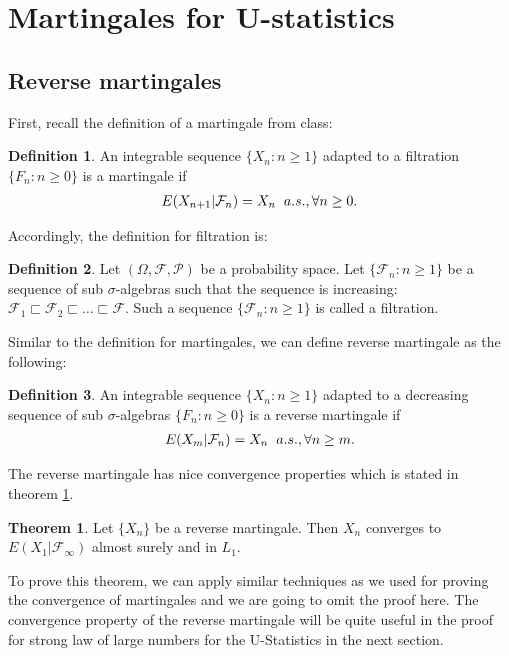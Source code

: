 \documentclass{article}
\theoremstyle{definition}
\newtheorem{theorem}{Theorem}
\newtheorem{Def}{Definition}
\numberwithin{Def}{section}
\begin{document}
\section{Martingales for U-statistics}
\subsection{Reverse martingales}
First, recall the definition of a martingale from class:
\begin{Def}
An integrable sequence $\{X_n: n\ge 1\}$ adapted to a filtration $\{F_n: n\ge 0\}$ is a martingale if
\begin{align*}
 E(X_{n+1}|\mathcal{F}_n)=X_n \hspace{0.2cm} a.s., \forall n\ge0.
\end{align*}
\end{Def}

Accordingly, the definition for filtration is:
\begin{Def}
Let $(\Omega, \mathcal{F}, \mathcal{P})$ be a probability space. Let $\{\mathcal{F}_n: n\ge1\}$ be a sequence of sub $\sigma$-algebras such that the sequence is increasing: $\mathcal{F}_1 \sqsubset \mathcal{F}_2 \sqsubset \dotsc \sqsubset \mathcal{F}$. Such a sequence $\{\mathcal{F}_n: n\ge1\}$ is called a filtration. 
\end{Def}

Similar to the definition for martingales, we can define reverse martingale as the following:
\begin{Def}
An integrable sequence $\{X_n: n\ge 1\}$ adapted to a decreasing sequence of sub $\sigma$-algebras $\{F_n: n\ge 0\}$ is a reverse martingale if
\begin{align*}
 E(X_m|\mathcal{F}_n)=X_n \hspace{0.2cm} a.s., \forall n\ge m.
\end{align*}
\end{Def}

The reverse martingale has nice convergence properties which is stated in theorem \ref{conv_rm}.
\begin{theorem}\label{conv_rm}
Let $\{X_n\}$ be a reverse martingale. Then $X_n$ converges to $E(X_1|\mathcal{F}_{\infty})$ almost surely and in $L_1$. 
\end{theorem}
To prove this theorem, we can apply similar techniques as we used for proving the convergence of martingales and we are going to omit the proof here. The convergence property of the reverse martingale will be quite useful in the proof for strong law of large numbers for the U-Statistics in the next section.
\end{document}
